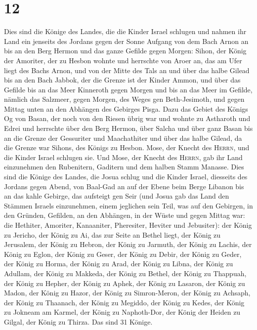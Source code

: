 \hypertarget{section-11}{%
\section{12}\label{section-11}}

 Dies sind die Könige des Landes, die die Kinder Israel
schlugen und nahmen ihr Land ein jenseits des Jordans gegen der Sonne
Aufgang von dem Bach Arnon an bis an den Berg Hermon und das ganze
Gefilde gegen Morgen:  Sihon, der König der Amoriter, der
zu Hesbon wohnte und herrschte von Aroer an, das am Ufer liegt des Bachs
Arnon, und von der Mitte des Tals an und über das halbe Gilead bis an
den Bach Jabbok, der die Grenze ist der Kinder Ammon,  und
über das Gefilde bis an das Meer Kinneroth gegen Morgen und bis an das
Meer im Gefilde, nämlich das Salzmeer, gegen Morgen, des Weges gen
Beth-Jesimoth, und gegen Mittag unten an den Abhängen des Gebirges
Pisga.  Dazu das Gebiet des Königs Og von Basan, der noch
von den Riesen übrig war und wohnte zu Astharoth und Edrei
 und herrschte über den Berg Hermon, über Salcha und über
ganz Basan bis an die Grenze der Gessuriter und Maachathiter und über
das halbe Gilead, da die Grenze war Sihons, des Königs zu Hesbon.
 Mose, der Knecht des \textsc{Herrn}, und die Kinder
Israel schlugen sie. Und Mose, der Knecht des \textsc{Herrn}, gab ihr
Land einzunehmen den Rubenitern, Gaditern und dem halben Stamm Manasse.
 Dies sind die Könige des Landes, die Josua schlug und die
Kinder Israel, diesseits des Jordans gegen Abend, von Baal-Gad an auf
der Ebene beim Berge Libanon bis an das kahle Gebirge, das aufsteigt gen
Seir (und Josua gab das Land den Stämmen Israels einzunehmen, einem
jeglichen sein Teil,  was auf den Gebirgen, in den
Gründen, Gefilden, an den Abhängen, in der Wüste und gegen Mittag war:
die Hethiter, Amoriter, Kanaaniter, Pheresiter, Heviter und Jebusiter):
 der König zu Jericho, der König zu Ai, das zur Seite an
Bethel liegt,  der König zu Jerusalem, der König zu
Hebron,  der König zu Jarmuth, der König zu Lachis,
 der König zu Eglon, der König zu Geser, 
der König zu Debir, der König zu Geder,  der König zu
Horma, der König zu Arad,  der König zu Libna, der König
zu Adullam,  der König zu Makkeda, der König zu Bethel,
 der König zu Thappuah, der König zu Hepher,
 der König zu Aphek, der König zu Lasaron,
 der König zu Madon, der König zu Hazor, 
der König zu Simron-Meron, der König zu Achsaph,  der
König zu Thaanach, der König zu Megiddo,  der König zu
Kedes, der König zu Jokneam am Karmel,  der König zu
Naphoth-Dor, der König der Heiden zu Gilgal,  der König
zu Thirza. Das sind 31 Könige.

